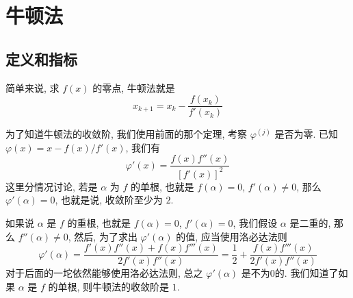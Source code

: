 \section{牛顿法}
\subsection{定义和指标}
\begin{frame}
简单来说, 求 \(f (x)\) 的零点, 牛顿法就是
\[
	x _{k+1} = x _{k} - \frac{f (x_{k})}{f ' (x_{k})}
\]
\end{frame}
\begin{frame}
\centering
{}
\end{frame}

\begin{frame}
为了知道牛顿法的收敛阶, 我们使用前面的那个定理, 考察 \(\varphi ^{(j)}\) 是否为零. 已知 \( \varphi (x) = x - f(x) / f' (x)\), 我们有
\[
	\varphi '(x) = \frac{f(x) f '' (x)}{[f '(x) ] ^{2}}
\]
这里分情况讨论, 若是 \( \alpha\) 为 \(f\) 的单根, 也就是 \( f( \alpha) = 0\), \( f ' (\alpha) \ne 0\), 那么 \( \varphi ' (\alpha ) =0\), 也就是说, 收敛阶至少为 \(2\).
\end{frame}
\begin{frame}
如果说 \( \alpha\) 是 \(f\) 的重根, 也就是 \( f(\alpha ) = 0\), \( f' (\alpha) = 0\), 我们假设 \( \alpha\) 是二重的, 那么 \( f ''( \alpha) \ne 0\), 然后, 为了求出 \( \varphi ' (\alpha)\) 的值, 应当使用洛必达法则
\[
\varphi ' (\alpha) = \frac{f'(x) f''(x) + f(x) f'''(x)}{2 f'(x) f''(x)} = \frac12 + \frac{f(x) f'''(x)}{2 f'(x) f''(x)}
\]
对于后面的一坨依然能够使用洛必达法则, 总之 \( \varphi '( \alpha)\) 是不为\(0\)的. 我们知道了如果 \( \alpha\) 是 \(f\) 的单根, 则牛顿法的收敛阶是 \(1\).
\end{frame}
